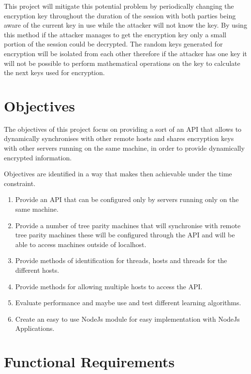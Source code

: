 This project will mitigate this potential problem by periodically changing the encryption key throughout the duration of the session with both parties being aware of the current key in use while the attacker will not know the key. By using this method if the attacker manages to get the encryption key only a small portion of the session could be decrypted. The random keys generated for encryption will be isolated from each other therefore if the attacker has one key it will not be possible to perform mathematical operations on the key to calculate the next keys used for encryption. 

\section{Objectives}
The objectives of this project focus on providing a sort of an API that allows to dynamically synchronises with other remote hosts and shares encryption keys with other servers running on the same machine, in order to provide dynamically encrypted information.

Objectives are identified in a way that makes then achievable under the time constraint.

\begin{enumerate}
	\item Provide an API that can be configured only by servers running only on the same machine.
	\item Provide a number of tree parity machines that will synchronise with remote tree parity machines these will be configured through the API and will be able to access machines outside of localhost.
	\item Provide methods of identification for threads, hosts and threads for the different hosts.
	\item Provide methods for allowing multiple hosts to access the API.
	\item Evaluate performance and maybe use and test different learning algorithms.
	\item Create an easy to use NodeJs module for easy implementation with NodeJs Applications.
\end{enumerate}

\section{Functional Requirements}


